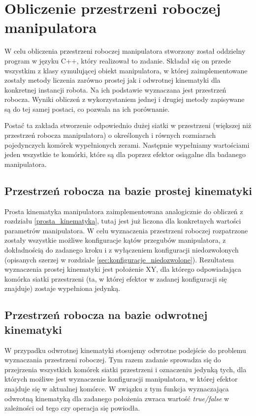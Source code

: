 \documentclass[printmode]{mgr}
\begin{document}
\section{Obliczenie przestrzeni roboczej manipulatora}\label{sec:obliczenie_przestrzeni_roboczej}
W celu obliczenia przestrzeni roboczej manipulatora stworzony został oddzielny program w języku C++, 
który realizował to zadanie. Składał się on przede wszystkim z klasy symulującej obiekt manipulatora, 
w której zaimplementowane zostały metody liczenia zarówno prostej jak i odwrotnej kinematyki dla
konkretnej instancji robota. Na ich podstawie wyznaczana jest przestrzeń robocza. Wyniki obliczeń
z wykorzystaniem jednej i drugiej metody zapisywane są do tej samej postaci, co pozwala na ich porównanie.

Postać ta zakłada stworzenie odpowiednio dużej siatki w przestrzeni (większej niż
przestrzeń robocza manipulatora) o określonych i równych rozmiarach pojedynczych komórek
wypełnionych zerami. Następnie wypełniamy wartościami jeden wszystkie te komórki, które są dla
poprzez efektor osiągalne dla badanego manipulatora. 

\subsection{Przestrzeń robocza na bazie prostej kinematyki}
Prosta kinematyka manipulatora zaimplementowana analogicznie do obliczeń z rozdziału \ref{prosta_kinematyka},
tutaj jest już liczona dla konkretnych wartości parametrów manipulatora. 
W celu wyznaczenia przestrzeni roboczej rozpatrzone zostały wszystkie możliwe konfiguracje
kątów przegubów manipulatora, z dokładnością do zadanego kroku i z wyłączeniem konfiguracji
niedozwolonych (opisanych szerzej w rozdziale \ref{sec:konfiguracje_niedozwolone}).
Rezultatem wyznaczenia prostej kinematyki jest położenie XY, dla którego odpowiadająca komórka
siatki przestrzeni (ta, w której efektor w zadanej konfiguracji się znajduje)
zostaje wypełniona jedynką. 

\subsection{Przestrzeń robocza na bazie odwrotnej kinematyki}
W przypadku odwrotnej kinematyki stosujemy odwrotne podejście do problemu wyznaczania przestrzeni roboczej. 
Tym razem zadanie sprowadza się do przejrzenia wszystkich komórek siatki przestrzeni i oznaczeniu
jedynką tych, dla których możliwe jest wyznaczenie konfiguracji manipulatora, w której efektor
znajduje się w aktualnej komórce. W związku z tym funkcja wyznaczająca odwrotną kinematyką
dla zadanego położenia zwraca wartość \emph{true/false} w zależności od tego czy operacja
się powiodła. 
\end{document}
